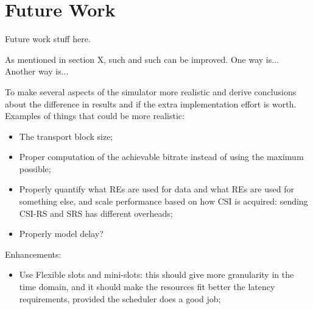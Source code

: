 \section*{Future Work}
\label{sec:future-work}

Future work stuff here.


As mentioned in section X, such and such can be improved. One way is... Another way is... 








To make several aspects of the simulator more realistic and derive conclusions about the difference in results and if the extra implementation effort is worth. Examples of things that could be more realistic:
\begin{itemize}
    \item The transport block size;
    \item Proper computation of the achievable bitrate instead of using the maximum possible;
    \item Properly quantify what REs are used for data and what REs are used for something else, and scale performance based on how CSI is acquired: sending CSI-RS and SRS has different overheads;
    \item Properly model delay?
\end{itemize}



Enhancements:
\begin{itemize}
    \item Use Flexible slots and mini-slots: this should give more granularity in the time domain, and it should make the resources fit better the latency requirements, provided the scheduler does a good job;
\end{itemize}


